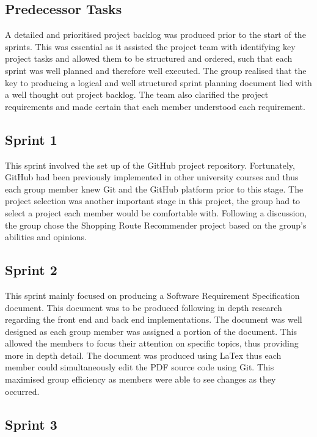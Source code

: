 \documentclass[10pt,twocolumn]{witseiepaper}
\begin{document}
		\subsection{Predecessor Tasks} 
		
		A detailed and prioritised project backlog was produced prior to the start of the sprints. This was essential as it assisted the project team with identifying key project tasks and allowed them to be structured and ordered, such that each sprint was well planned and therefore well executed.  The group realised that the key to producing a logical and well structured sprint planning document lied with a well thought out project backlog. The team also clarified the project requirements and made certain that each member understood each requirement. 
		
		\subsection{Sprint 1}
		
		This sprint involved the set up of the GitHub project repository. Fortunately, GitHub had been previously implemented in other university courses and thus each group member knew Git and the GitHub platform prior to this stage. The project selection was another important stage in this project, the group had to select a project each member would be comfortable with. Following a discussion, the group chose the Shopping Route Recommender project based on the group's abilities and opinions. 
		
		\subsection{Sprint 2}
		
		This sprint mainly focused on producing a Software Requirement Specification document. This document was to be produced following in depth research regarding the front end and back end implementations. The document was well designed as each group member was assigned a portion of the document. This allowed the members to focus their attention on specific topics, thus providing more in depth detail. The document was produced using LaTex thus each member could simultaneously edit the PDF source code using Git. This maximised group efficiency as members were able to see changes as they occurred.  
		
		\subsection{Sprint 3}
		
\end{document}

